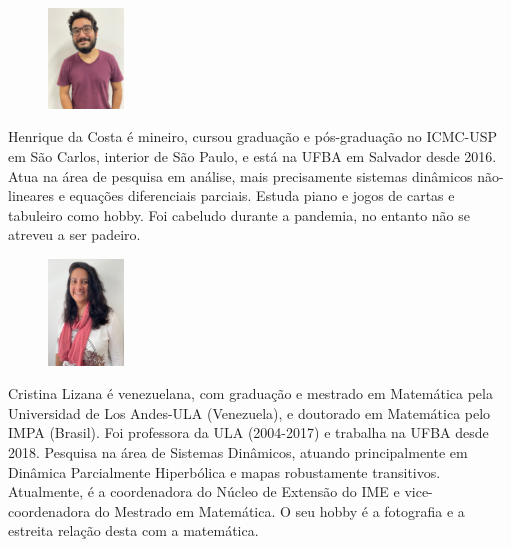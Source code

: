 \documentclass{hipatia}
\begin{document}
\vspace{0.5cm}
\begin{figure}
	\vspace{-10pt}
	\includegraphics[width=2cm]{Henrique.jpg}
\end{figure}\noindent  
  Henrique da Costa é mineiro, cursou graduação e pós-graduação 
  no ICMC-USP em São Carlos, interior de São Paulo, e está na UFBA em Salvador 
  desde 2016. Atua na área de pesquisa em análise, mais precisamente sistemas 
  dinâmicos não-lineares e equações diferenciais parciais. 
  Estuda piano e jogos de cartas e tabuleiro como hobby. 
  Foi cabeludo durante a pandemia, no entanto não se atreveu a ser padeiro.
\vspace{0.5cm}

\begin{figure}
	\vspace{-0pt}
	\includegraphics[width=2cm]{Cristina.jpg}
\end{figure}\noindent  
Cristina Lizana é venezuelana, com graduação e mestrado em Matemática 
pela Universidad de Los Andes-ULA (Venezuela), e doutorado em Matemática pelo IMPA (Brasil).
Foi professora da ULA (2004-2017) e trabalha na UFBA desde 2018. Pesquisa na área de 
Sistemas Dinâmicos, atuando principalmente em Dinâmica Parcialmente Hiperbólica 
e mapas robustamente transitivos. Atualmente, é a coordenadora do Núcleo de Extensão do IME e vice-coordenadora do Mestrado em Matemática. O seu hobby é a fotografia e a estreita relação desta com a matemática.
\end{document}
